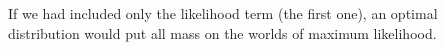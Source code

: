 \documentclass{article}
\theoremstyle{plain}
\theoremstyle{definition}
\theoremstyle{remark}
\newcommand{\todo}[1]{{\color{red}\ \!\Large\smash{\textbf{[}}{\normalsize\textsc{todo:} #1}\ \!\smash{\textbf{]}}}}
\newcommand{\dg}[1]{\mathbdcal{#1}}
\numberwithin{equation}{section}
\begin{document}
\vspace{-1em}
If we had included only the likelihood term (the first one), an
optimal distribution would put all mass on the worlds of maximum
likelihood.
%
\end{document}
